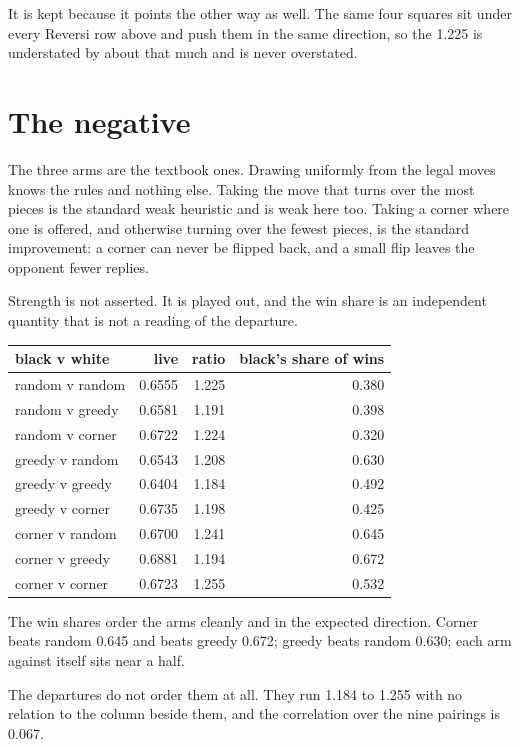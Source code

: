 It is kept because it points the other way as well. The same four squares sit under every Reversi row
above and push them in the same direction, so the 1.225 is understated by about that much and is
never overstated.

\section{The negative}

The three arms are the textbook ones. Drawing uniformly from the legal moves knows the rules and
nothing else. Taking the move that turns over the most pieces is the standard weak heuristic and is
weak here too. Taking a corner where one is offered, and otherwise turning over the fewest pieces, is
the standard improvement: a corner can never be flipped back, and a small flip leaves the opponent
fewer replies.

Strength is not asserted. It is played out, and the win share is an independent quantity that is not
a reading of the departure.

\begin{center}
\begin{tabular}{@{}lrrr@{}}
\toprule
black v white & live & ratio & black's share of wins \\
\midrule
random v random & 0.6555 & 1.225 & 0.380 \\
random v greedy & 0.6581 & 1.191 & 0.398 \\
random v corner & 0.6722 & 1.224 & 0.320 \\
greedy v random & 0.6543 & 1.208 & 0.630 \\
greedy v greedy & 0.6404 & 1.184 & 0.492 \\
greedy v corner & 0.6735 & 1.198 & 0.425 \\
corner v random & 0.6700 & 1.241 & 0.645 \\
corner v greedy & 0.6881 & 1.194 & 0.672 \\
corner v corner & 0.6723 & 1.255 & 0.532 \\
\bottomrule
\end{tabular}
\end{center}

The win shares order the arms cleanly and in the expected direction. Corner beats random 0.645 and
beats greedy 0.672; greedy beats random 0.630; each arm against itself sits near a half.

The departures do not order them at all. They run 1.184 to 1.255 with no relation to the column
beside them, and the correlation over the nine pairings is 0.067.


